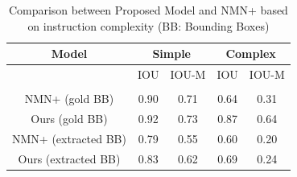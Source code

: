 \begin{table}[ht]
    \centering
    \caption{Comparison between Proposed Model and NMN+ based on instruction complexity  (BB: Bounding Boxes)}
    \begin{tabular}{|c|c|c|c|c|}
    \hline
         Model  & \multicolumn{2}{|c|}{Simple} & \multicolumn{2}{|c|}{Complex} \\ 
         \hline
         \hline
          & IOU & IOU-M & IOU & IOU-M  \\
            &  &  &  &   \\
          \hline
         NMN+ (gold BB) & 0.90 & 0.71 & 0.64 & 0.31\\ 
         \hline 
         Ours (gold BB)  & 0.92 & 0.73 & 0.87 & 0.64 \\
        \hline 
         NMN+ (extracted BB) & 0.79 & 0.55 & 0.60 & 0.20\\ 
         \hline 
         Ours (extracted BB) & 0.83 & 0.62 & 0.69 & 0.24\\
         \hline 
    \end{tabular}
    \label{tab:accuracy2}
\end{table} 






